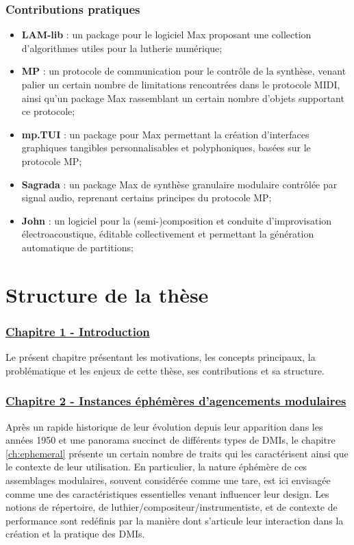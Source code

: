 \subsubsection*{Contributions pratiques}

\begin{itemize}[noitemsep]
\item \textbf{LAM-lib} : un package pour le logiciel Max proposant une collection d'algorithmes utiles pour la lutherie numérique;
\item \textbf{MP} : un protocole de communication pour le contrôle de la synthèse, venant palier un certain nombre de limitations rencontrées dans le protocole MIDI, ainsi qu'un package Max rassemblant un certain nombre d'objets supportant ce protocole;
\item \textbf{mp.TUI} : un package pour Max permettant la création d'interfaces graphiques tangibles personnalisables et polyphoniques, basées sur le protocole MP;
\item \textbf{Sagrada} : un package Max de synthèse granulaire modulaire contrôlée par signal audio, reprenant certains principes du protocole MP;
\item \textbf{John} : un logiciel pour la (semi-)composition et conduite d'improvisation électroacoustique, éditable collectivement et permettant la génération automatique de partitions;
\end{itemize}


\section{Structure de la thèse}
\label{sec:preamble:structure}

\subsubsection*{\hyperref[ch:introduction]{Chapitre 1 - Introduction}} 
\noindent Le présent chapitre présentant les motivations, les concepts principaux, la problématique et les enjeux de cette thèse, ses contributions et sa structure.

\subsubsection*{\hyperref[ch:ephemeral]{Chapitre 2 - Instances éphémères d'agencements modulaires}}

\noindent Après un rapide historique de leur évolution depuis leur apparition dans les années 1950 et une panorama succinct de différents types de \glspl{DMI}, le chapitre \ref{ch:ephemeral} présente un certain nombre de traits qui les caractérisent ainsi que le contexte de leur utilisation. En particulier, la nature éphémère de ces assemblages modulaires, souvent considérée comme une tare, est ici envisagée comme une des caractéristiques essentielles venant influencer leur design. Les notions de répertoire, de luthier/compositeur/instrumentiste, et de contexte de performance sont redéfinis par la manière dont s'articule leur interaction dans la création et la pratique des \glspl{DMI}.

